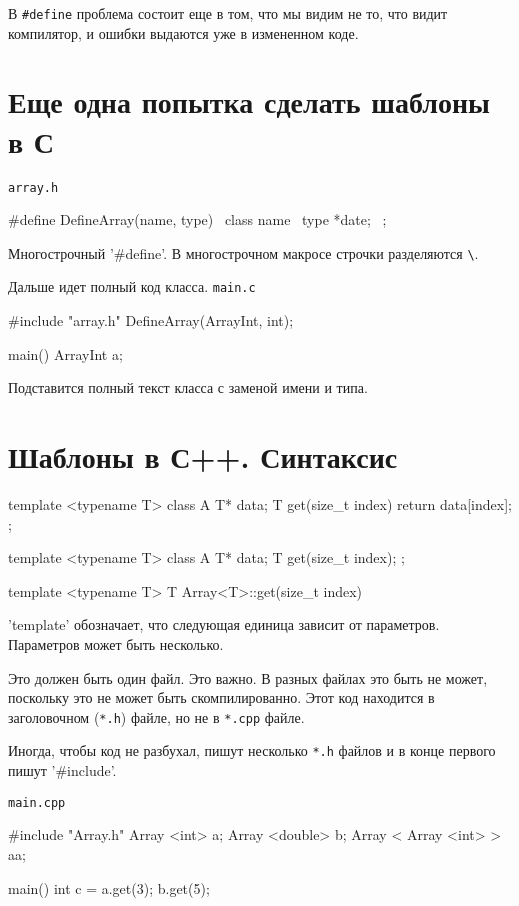 В \verb'#define' проблема состоит еще в том, что мы видим не то, что видит компилятор, и ошибки выдаются уже в измененном коде.

\section{Еще одна попытка сделать шаблоны в С} 

\verb'array.h'
\begin{cppcode}
#define DefineArray(name, type) \
class name{ \
   type *date; \
};
\end{cppcode}
Многострочный \cpp'#define'. В многострочном макросе строчки разделяются \verb'\'. 

Дальше идет полный код класса. 
\verb'main.c'
\begin{cppcode}
#include "array.h"
DefineArray(ArrayInt, int);

main() {
    ArrayInt a;
}
\end{cppcode}
Подставится полный текст класса с заменой имени и типа. 

\section{Шаблоны в С++. Синтаксис}
         
\begin{cppcode}
template <typename T>
class A {
    T* data;
    T get(size_t index) {
        return data[index];
    }
};
\end{cppcode}

\begin{cppcode}
template <typename T>
class A {
    T* data;
    T get(size_t index);
};

template <typename T>
T Array<T>::get(size_t index) {

}
\end{cppcode}

\cpp'template' обозначает, что следующая единица зависит от параметров. Параметров может быть несколько. 

Это должен быть один файл.
Это важно.
В разных файлах это быть не может, поскольку это не может быть скомпилированно.
Этот код находится в заголовочном (\verb'*.h') файле, но не в \verb'*.cpp' файле.

Иногда, чтобы код не разбухал, пишут несколько \verb'*.h' файлов и в конце первого пишут \cpp'#include'.

\verb'main.cpp'
\begin{cppcode}
#include "Array.h"
Array <int> a;
Array <double> b;
Array < Array <int> > aa; 

main() {
    int c = a.get(3);
    b.get(5);
}
\end{cppcode}

